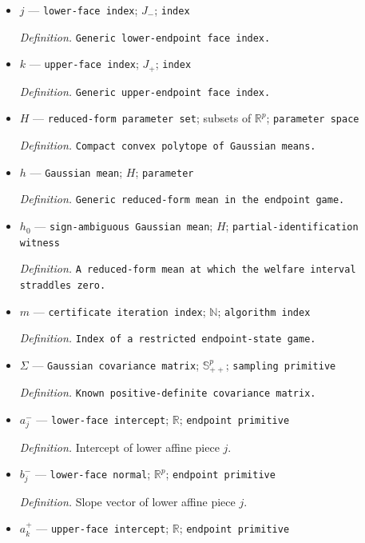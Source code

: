 \documentclass{article}
\begin{document}
\begin{itemize}
  \item \(j\) --- \texttt{lower-\allowbreak{}face index}; \(J_{-}\); \texttt{index}
  \par\smallskip\noindent\emph{Definition.} \texttt{Generic lower-\allowbreak{}endpoint face index.}
  \item \(k\) --- \texttt{upper-\allowbreak{}face index}; \(J_{+}\); \texttt{index}
  \par\smallskip\noindent\emph{Definition.} \texttt{Generic upper-\allowbreak{}endpoint face index.}
  \item \(H\) --- \texttt{reduced-\allowbreak{}form parameter set}; subsets of \(\mathbb R^{p}\); \texttt{parameter space}
  \par\smallskip\noindent\emph{Definition.} \texttt{Compact convex polytope of Gaussian means.}
  \item \(h\) --- \texttt{Gaussian mean}; \(H\); \texttt{parameter}
  \par\smallskip\noindent\emph{Definition.} \texttt{Generic reduced-\allowbreak{}form mean in the endpoint game.}
  \item \(h_0\) --- \texttt{sign-\allowbreak{}ambiguous Gaussian mean}; \(H\); \texttt{partial-\allowbreak{}identification witness}
  \par\smallskip\noindent\emph{Definition.} \texttt{A reduced-\allowbreak{}form mean at which the welfare interval straddles zero.}
  \item \(m\) --- \texttt{certificate iteration index}; \(\mathbb N\); \texttt{algorithm index}
  \par\smallskip\noindent\emph{Definition.} \texttt{Index of a restricted endpoint-\allowbreak{}state game.}
  \item \(\Sigma\) --- \texttt{Gaussian covariance matrix}; \(\mathbb S_{++}^{p}\); \texttt{sampling primitive}
  \par\smallskip\noindent\emph{Definition.} \texttt{Known positive-\allowbreak{}definite covariance matrix.}
  \item \(a_j^{-}\) --- \texttt{lower-\allowbreak{}face intercept}; \(\mathbb R\); \texttt{endpoint primitive}
  \par\smallskip\noindent\emph{Definition.} Intercept of lower affine piece \(j\).
  \item \(b_j^{-}\) --- \texttt{lower-\allowbreak{}face normal}; \(\mathbb R^{p}\); \texttt{endpoint primitive}
  \par\smallskip\noindent\emph{Definition.} Slope vector of lower affine piece \(j\).
  \item \(a_k^{+}\) --- \texttt{upper-\allowbreak{}face intercept}; \(\mathbb R\); \texttt{endpoint primitive}

\end{itemize}
\end{document}
